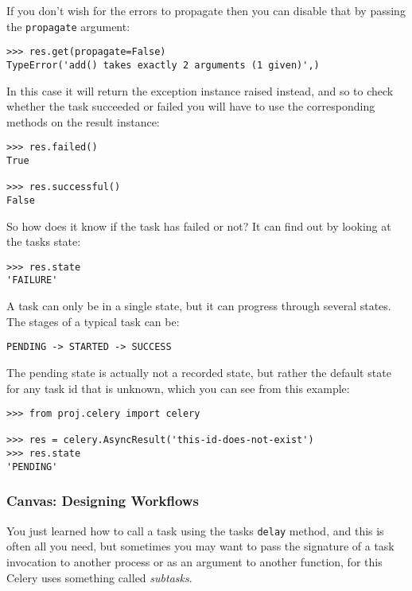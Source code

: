 \documentclass[9pt,a4paper]{article}
\begin{document}
\begin{CJK*}{GBK}{kai}
If you don\textquoteright t wish for the errors to propagate then you can disable that by passing the \verb"propagate" argument:

\begin{Verbatim}[frame=single]
>>> res.get(propagate=False)
TypeError('add() takes exactly 2 arguments (1 given)',)
\end{Verbatim}

In this case it will return the exception instance raised instead, and so to check whether the task succeeded or failed you will have to use the corresponding methods on the result instance:

\begin{Verbatim}[frame=single]
>>> res.failed()
True

>>> res.successful()
False
\end{Verbatim}

So how does it know if the task has failed or not? It can find out by looking at the tasks state:

\begin{Verbatim}[frame=single]
>>> res.state
'FAILURE'
\end{Verbatim}

A task can only be in a single state, but it can progress through several states. The stages of a typical task can be:

\begin{Verbatim}[frame=single]
PENDING -> STARTED -> SUCCESS
\end{Verbatim}

The pending state is actually not a recorded state, but rather the default state for any task id that is unknown, which you can see from this example:

\begin{Verbatim}[frame=single]
>>> from proj.celery import celery

>>> res = celery.AsyncResult('this-id-does-not-exist')
>>> res.state
'PENDING'
\end{Verbatim}

\subsubsection{Canvas: Designing Workflows}
You just learned how to call a task using the tasks \verb"delay" method, and this is often all you need, but sometimes you may want to pass the signature of a task invocation to another process or as an argument to another function, for this Celery uses something called \textit{subtasks}.


\end{CJK*}
\end{document}
